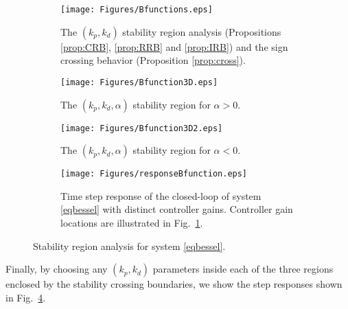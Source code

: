 \documentclass[twoside,reqno,11pt]{fcaa-var} %
\begin{document}
\begin{figure}[]
	\centering
	\begin{subfigure}[b]{0.48\columnwidth}
		\centering
		\texttt{[image: Figures/Bfunctions.eps]}
		\caption{The $(k_p,k_d)$ stability region analysis (Propositions \ref{prop:CRB}, \ref{prop:RRB} and \ref{prop:IRB}) and  the sign crossing behavior (Proposition \ref{prop:cross}).}
		\label{BesselRegiona}
	\end{subfigure}
	\hfill
	\begin{subfigure}[b]{0.48\columnwidth}
		\centering
		\texttt{[image: Figures/Bfunction3D.eps]}
		\caption{The $(k_p,k_d,\alpha)$ stability region for $\alpha>0$.}
		\label{BesselRegionb}
	\end{subfigure}
	\hfill
	\begin{subfigure}[b]{0.48\columnwidth}
		\centering
		\texttt{[image: Figures/Bfunction3D2.eps]}
		\caption{The $(k_p,k_d,\alpha)$ stability region for $\alpha<0$.}
		\label{BesselRegionc}
	\end{subfigure}
	\hfill
	\begin{subfigure}[b]{0.48\columnwidth}
		\centering
		\texttt{[image: Figures/responseBfunction.eps]}
		\caption{Time step response of the closed-loop of system \eqref{eqbessel} with distinct controller gains. Controller gain locations are illustrated in Fig.~\ref{BesselRegiona}.}
		\label{BesselSresponses}
	\end{subfigure}
	\caption{Stability region analysis for system \eqref{eqbessel}.}\label{BesselRegion}
\end{figure}
Finally, by choosing any $(k_p,k_d)$ parameters inside each of the three regions enclosed by the stability crossing boundaries, we show the step responses shown in Fig.~\ref{BesselSresponses}. 
\end{document}
